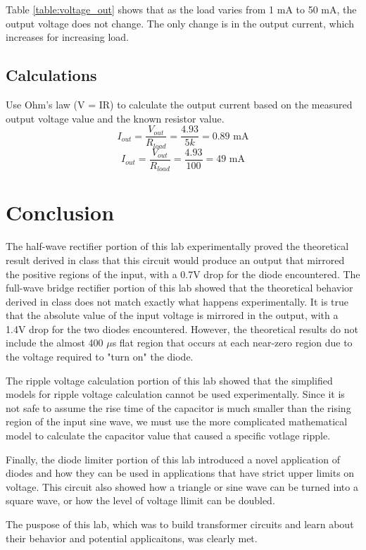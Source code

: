 \documentclass[12pt,letterpaper]{report}
\begin{document}
Table \ref{table:voltage_out} shows that as the load varies from 1 mA to 50 mA, the output voltage does not change. The only change is in the output current, which increases for increasing load.

\subsection*{Calculations}

Use Ohm's law (V = IR) to calculate the output current based on the measured output voltage value and the known resistor value.
$$
I_{out} = \frac{V_{out}}{R_{load}} = \frac{4.93}{5k} = 0.89\text{ mA}
$$
$$
I_{out} = \frac{V_{out}}{R_{load}} = \frac{4.93}{100} = 49\text{ mA}
$$

\section*{Conclusion}

The half-wave rectifier portion of this lab experimentally proved the theoretical result derived in class that this circuit would produce an output that mirrored the positive regions of the input, with a 0.7V drop for the diode encountered. The full-wave bridge rectifier portion of this lab showed that the theoretical behavior derived in class does not match exactly what happens experimentally. It is true that the absolute value of the input voltage is mirrored in the output, with a 1.4V drop for the two diodes encountered. However, the theoretical results do not include the almost 400 $\mu$s flat region that occurs at each near-zero region due to the voltage required to "turn on" the diode. 

The ripple voltage calculation portion of this lab showed that the simplified models for ripple voltage calculation cannot be used experimentally. Since it is not safe to assume the rise time of the capacitor is much smaller than the rising region of the input sine wave, we must use the more complicated mathematical model to calculate the capacitor value that caused a specific votlage ripple.

Finally, the diode limiter portion of this lab introduced a novel application of diodes and how they can be used in applications that have strict upper limits on voltage. This circuit also showed how a triangle or sine wave can be turned into a square wave, or how the level of voltage llimit can be doubled.

The puspose of this lab, which was to build transformer circuits and learn about their behavior and potential applicaitons, was clearly met.
\end{document}
